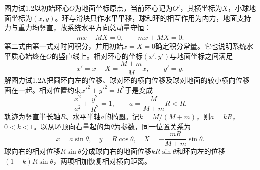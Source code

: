 \documentclass[UTF8,fontset=fandol,a4paper,11pt]{ctexart}
\begin{document}
图力试1.2以初始环心$O$为地面坐标原点，当前环心记为$O'$，其横坐标为$X$，小球地面坐标为$(x,y)$。环与滑块只作水平平移，球和环的相互作用为内力，地面支持力与重力均竖直，故系统水平方向总动量守恒：
\[
m\dot x+M\dot X=0,\qquad mx+MX=0.
\]
第二式由第一式对时间积分，并用初始$x=X=0$确定积分常量。它也说明系统水平质心始终在$O$的竖直线上。相对环心的坐标$(x',y')$与地面坐标之间满足
\[
x'=x-X=\frac{M+m}{M}x,\qquad y'=y.
\]
解图力试1.2A把圆环向左的位移、球对环的横向位移及球对地面的较小横向位移画在一起。相对位置约束$x'^2+y'^2=R^2$于是变成
\[
\boxed{\frac{x^2}{a^2}+\frac{y^2}{R^2}=1},
\qquad a=\frac{M}{M+m}R<R.
\]
轨迹为竖直半长轴$R$、水平半轴$a$的椭圆。记$k=M/(M+m)$，则$a=kR$，$0<k<1$。以从环顶向右量起的角$\theta$为参数，同一位置关系为
\[
x=a\sin\theta,\quad y=R\cos\theta,\quad
X=-\frac{mR}{M+m}\sin\theta.
\]
球向右的相对位移$R\sin\theta$分成球向右的地面位移$kR\sin\theta$和环向左的位移$(1-k)R\sin\theta$，两项相加恢复相对横向距离。
\end{document}
